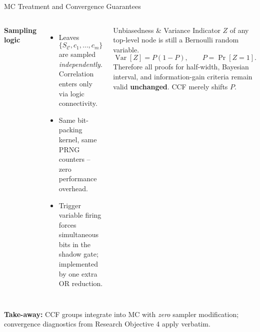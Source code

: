 \begin{frame}{MC Treatment and Convergence Guarantees}
  \begin{columns}[T]
    \textbf{Sampling logic}
    \begin{itemize}
      \item Leaves $\{S_{\mathcal C},c_1,\dots,c_m\}$ are sampled \emph{independently}.  Correlation enters only via logic connectivity.
      \item Same bit-packing kernel, same PRNG counters – zero performance overhead.
      \item Trigger variable firing forces simultaneous bits in the shadow gate; implemented by one extra OR reduction.
    \end{itemize}
    \begin{block}{Unbiasedness & Variance}
      Indicator $Z$ of any top-level node is still a Bernoulli random variable.
      \[
        \operatorname{Var}[Z] = P(1-P),\qquad P=\Pr[Z=1].
      \]
      Therefore all proofs for half-width, Bayesian interval, and information-gain criteria remain valid \textbf{unchanged}.  CCF merely shifts $P$.
    \end{block}
  \end{columns}
  \vspace{4pt}
  \textbf{Take-away:} CCF groups integrate into MC with \emph{zero} sampler modification; convergence diagnostics from Research Objective 4 apply verbatim.
\end{frame}

